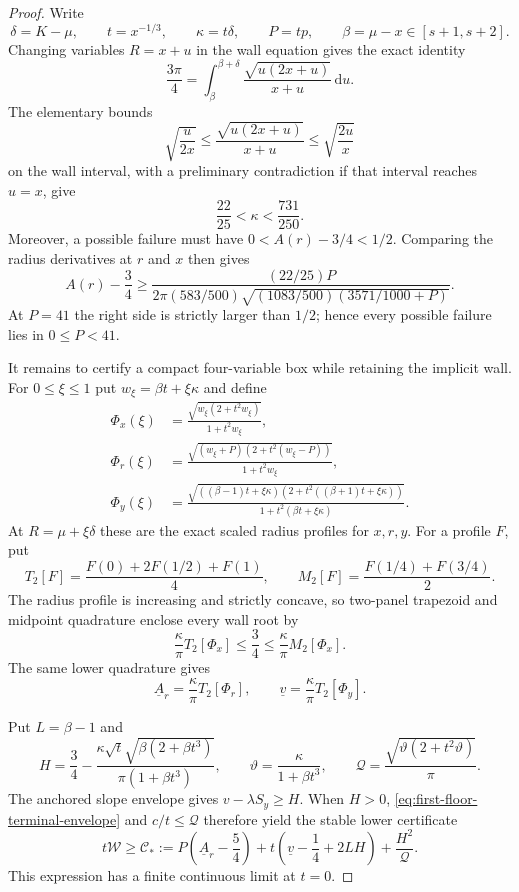 \documentclass[11pt]{article}
\theoremstyle{remark}
\newcommand{\dd}{\,\mathrm d}
\begin{document}
\begin{proof}
Write
\[
 \delta=K-\mu,\qquad t=x^{-1/3},\qquad
 \kappa=t\delta,\qquad P=tp,
 \qquad \beta=\mu-x\in[s+1,s+2].
\]
Changing variables $R=x+u$ in the wall equation gives the exact identity
\begin{equation}
 \frac{3\pi}{4}=\int_\beta^{\beta+\delta}
 \frac{\sqrt{u(2x+u)}}{x+u}\dd u.
 \label{eq:first-floor-compact-wall}
\end{equation}
The elementary bounds
\[
 \sqrt{\frac{u}{2x}}
 \leq\frac{\sqrt{u(2x+u)}}{x+u}
 \leq\sqrt{\frac{2u}{x}}
\]
on the wall interval, with a preliminary contradiction if that interval
reaches $u=x$, give
\begin{equation}
 \frac{22}{25}<\kappa<\frac{731}{250}.
 \label{eq:first-floor-kappa-box}
\end{equation}
Moreover, a possible failure must have
$0<A(r)-3/4<1/2$.  Comparing the radius derivatives at $r$ and $x$ then
gives
\[
 A(r)-\frac34\geq
 \frac{(22/25)P}
 {2\pi(583/500)\sqrt{(1083/500)(3571/1000+P)}}.
\]
At $P=41$ the right side is strictly larger than $1/2$; hence every
possible failure lies in $0\leq P<41$.

It remains to certify a compact four-variable box while retaining the
implicit wall.  For $0\leq\xi\leq1$ put
$w_\xi=\beta t+\xi\kappa$ and define
\begin{align*}
 \Phi_x(\xi)&=\frac{\sqrt{w_\xi(2+t^2w_\xi)}}{1+t^2w_\xi},\\
 \Phi_r(\xi)&=
 \frac{\sqrt{(w_\xi+P)(2+t^2(w_\xi-P))}}{1+t^2w_\xi},\\
 \Phi_y(\xi)&=
 \frac{\sqrt{((\beta-1)t+\xi\kappa)
 (2+t^2((\beta+1)t+\xi\kappa))}}
 {1+t^2(\beta t+\xi\kappa)}.
\end{align*}
At $R=\mu+\xi\delta$ these are the exact scaled radius profiles for
$x,r,y$.  For a profile $F$, put
\[
 T_2[F]=\frac{F(0)+2F(1/2)+F(1)}4,
 \qquad M_2[F]=\frac{F(1/4)+F(3/4)}2.
\]
The radius profile is increasing and strictly concave, so two-panel
trapezoid and midpoint quadrature enclose every wall root by
\begin{equation}
 \frac\kappa\pi T_2[\Phi_x]\leq\frac34
 \leq\frac\kappa\pi M_2[\Phi_x].
 \label{eq:first-floor-wall-enclosure}
\end{equation}
The same lower quadrature gives
\[
 \underline A_r=\frac\kappa\pi T_2[\Phi_r],
 \qquad \underline v=\frac\kappa\pi T_2[\Phi_y].
\]

Put $L=\beta-1$ and
\[
 H=\frac34-
 \frac{\kappa\sqrt t\sqrt{\beta(2+\beta t^3)}}
 {\pi(1+\beta t^3)},\qquad
 \vartheta=\frac\kappa{1+\beta t^3},\qquad
 \mathcal Q=\frac{\sqrt{\vartheta(2+t^2\vartheta)}}\pi.
\]
The anchored slope envelope gives $v-\lambda S_y\geq H$.  When $H>0$,
\eqref{eq:first-floor-terminal-envelope} and
$c/t\leq\mathcal Q$ therefore yield the stable lower certificate
\begin{equation}
 t\mathcal W\geq
 \mathcal C_*:=P\left(\underline A_r-\frac54\right)
 +t\left(\underline v-\frac14+2LH\right)
 +\frac{H^2}{\mathcal Q}.
 \label{eq:first-floor-stable-certificate}
\end{equation}
This expression has a finite continuous limit at $t=0$.


\end{proof}
\end{document}
